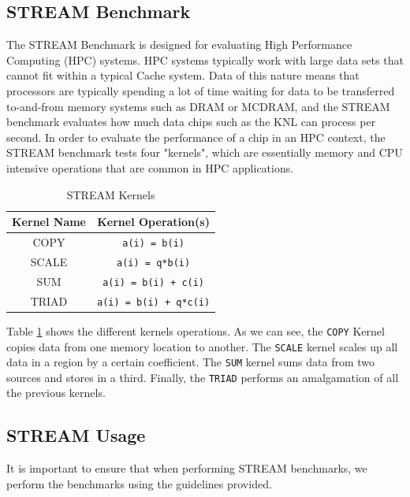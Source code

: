 \documentclass[bsc,frontabs,twoside,singlespacing,parskip,deptreport]{infthesis}     %
\begin{document}
\subsection{STREAM Benchmark}
The STREAM Benchmark is designed for evaluating High Performance Computing (HPC) systems. HPC systems typically work with large data sets that cannot fit within a typical Cache system. Data of this nature means that processors are typically spending a lot of time waiting for data to be transferred to-and-from memory systems such as DRAM or MCDRAM, and the STREAM benchmark evaluates how much data chips such as the KNL can process per second. In order to evaluate the performance of a chip in an HPC context, the STREAM benchmark tests four "kernels", which are essentially memory and CPU intensive operations that are common in HPC applications.

\begin{table}[!h]
\begin{center}
\caption{STREAM Kernels}
\label{fig:stream-kernels}
\begin{tabular}{ |c|c| } 
    \hline
    Kernel Name & Kernel Operation(s) \\
    \hline\hline
    COPY    & \texttt{a(i) = b(i)} \\
    \hline
    SCALE   & \texttt{a(i) = q*b(i)} \\
    \hline
    SUM     & \texttt{a(i) = b(i) + c(i)} \\
    \hline
    TRIAD   & \texttt{a(i) = b(i) + q*c(i)} \\
    \hline
\end{tabular}
\end{center}
\end{table}

Table \ref{fig:stream-kernels} shows the different kernels operations. As we can see, the \texttt{COPY} Kernel copies data from one memory location to another. The \texttt{SCALE} kernel scales up all data in a region by a certain coefficient. The \texttt{SUM} kernel sums data from two sources and stores in a third. Finally, the \texttt{TRIAD} performs an amalgamation of all the previous kernels.

\subsection{STREAM Usage}
It is important to ensure that when performing STREAM benchmarks, we perform the benchmarks using the guidelines provided.
\end{document}
